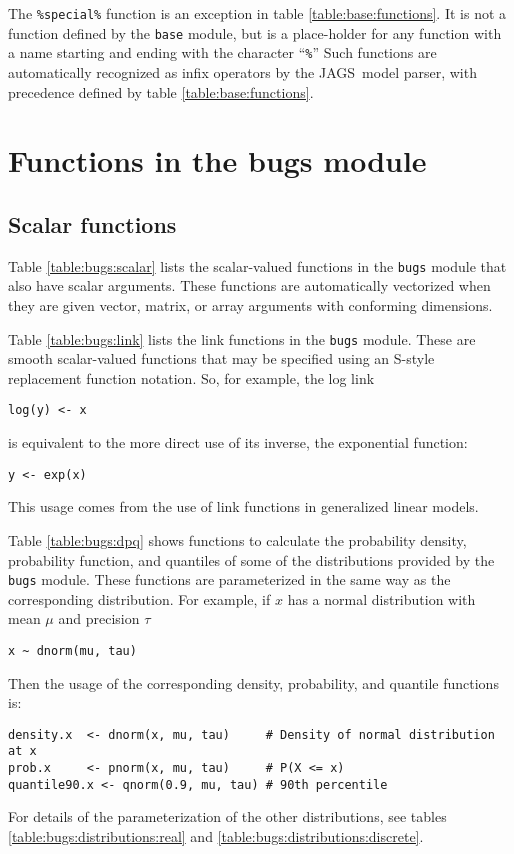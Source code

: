 \documentclass[11pt, a4paper, titlepage]{report}
\newcommand{\JAGS}{\textsf{JAGS}}
\begin{document}
The \verb+%special%+ function is an exception in table
\ref{table:base:functions}. It is not a function defined by the
\verb+base+ module, but is a place-holder for any function
with a name starting and ending with the character ``\verb+%+'' Such
functions are automatically recognized as infix operators by the
\JAGS\ model parser, with precedence defined by table
\ref{table:base:functions}.

\section{Functions in the bugs module}
\label{section:functions:bugs}

\subsection{Scalar functions}

Table \ref{table:bugs:scalar} lists the scalar-valued functions in the
\texttt{bugs} module that also have scalar arguments.  These functions
are automatically vectorized when they are given vector, matrix, or
array arguments with conforming dimensions.

Table \ref{table:bugs:link} lists the link functions in the
\texttt{bugs} module.  These are smooth scalar-valued functions that
may be specified using an S-style replacement function notation. So,
for example, the log link
\begin{verbatim}
log(y) <- x
\end{verbatim}
is equivalent to the more direct use of its inverse, the exponential
function:
\begin{verbatim}
y <- exp(x)
\end{verbatim}
This usage comes from the use of link functions in generalized linear
models.

Table \ref{table:bugs:dpq} shows functions to calculate the
probability density, probability function, and quantiles of some of
the distributions provided by the \texttt{bugs} module. These
functions are parameterized in the same way as the corresponding
distribution.  For example, if $x$ has a normal distribution with mean
$\mu$ and precision $\tau$
\begin{verbatim}
x ~ dnorm(mu, tau)
\end{verbatim}
Then the usage of the corresponding density, probability, and quantile
functions is: 
\begin{verbatim}
density.x  <- dnorm(x, mu, tau)     # Density of normal distribution at x
prob.x     <- pnorm(x, mu, tau)     # P(X <= x)
quantile90.x <- qnorm(0.9, mu, tau) # 90th percentile
\end{verbatim}
For details of the parameterization of the other distributions, see
tables \ref{table:bugs:distributions:real} and
\ref{table:bugs:distributions:discrete}.
\end{document}
